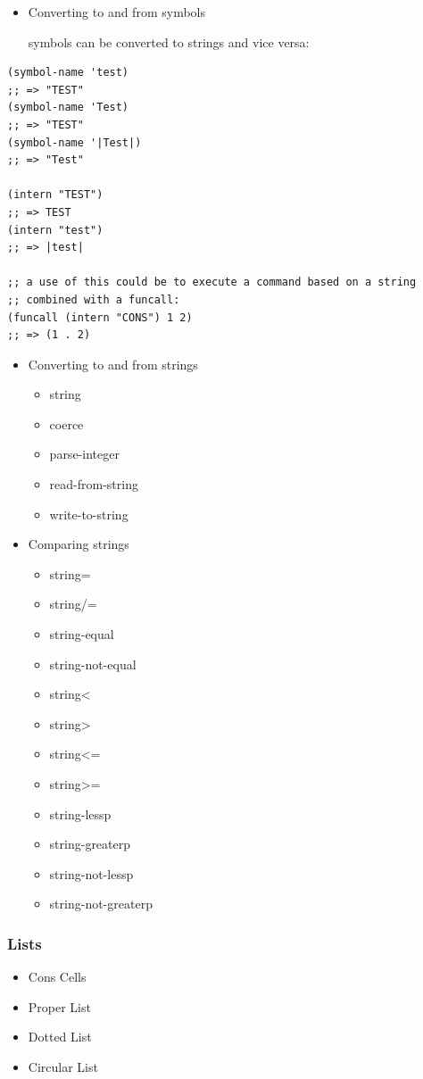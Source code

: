 \documentclass[11pt]{article}
\begin{document}
\begin{itemize}
\item Converting to and from symbols

symbols can be converted to strings and vice versa:
\end{itemize}

\begin{verbatim}
(symbol-name 'test)
;; => "TEST"
(symbol-name 'Test)
;; => "TEST"
(symbol-name '|Test|)
;; => "Test"

(intern "TEST")
;; => TEST
(intern "test")
;; => |test|

;; a use of this could be to execute a command based on a string
;; combined with a funcall:
(funcall (intern "CONS") 1 2)
;; => (1 . 2)
\end{verbatim}

\begin{itemize}
\item Converting to and from strings

\begin{itemize}
\item string
\item coerce
\item parse-integer
\item read-from-string
\item write-to-string
\end{itemize}
\end{itemize}


\begin{itemize}
\item Comparing strings
\begin{itemize}
\item string=
\item string/=
\item string-equal
\item string-not-equal
\item string<
\item string>
\item string<=
\item string>=
\item string-lessp
\item string-greaterp
\item string-not-lessp
\item string-not-greaterp
\end{itemize}
\end{itemize}


\subsubsection{Lists}
\label{sec-5-2-3}
\begin{itemize}
\item Cons Cells
\item Proper List
\item Dotted List
\item Circular List
\end{itemize}
\end{document}
